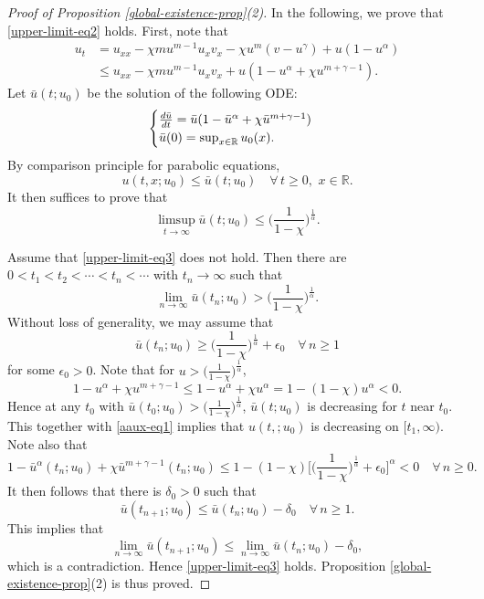 \documentclass[11pt]{article} %
\theoremstyle{remark}
\theoremstyle{remark}
\numberwithin{equation}{section}
\numberwithin{figure}{section}
\numberwithin{table}{section}
\begin{document}
\begin{proof} [Proof of Proposition \ref{global-existence-prop}(2)]
In the following, we prove that \eqref{upper-limit-eq2} holds. 
First,  note that
\begin{align*}
u_t&=u_{xx}-\chi m u^{m-1} u_x v_x-\chi u^m (v-u^\gamma)+u(1-u^\alpha)\\
&\le u_{xx}-\chi m u^{m-1} u_x v_x +u (1- u^\alpha +\chi u^{m+\gamma -1}).
\end{align*}
Let $\bar u(t;u_0)$ be the solution of the following ODE:
\begin{equation*}
\begin{cases}
\frac{d \bar u}{dt}=\bar u(1-\bar u^\alpha +\chi \bar u^{m+\gamma-1})\cr
\bar u(0)=\sup_{x\in\mathbb{R}} u_0(x).
\end{cases}
\end{equation*}
By comparison principle for parabolic equations,
$$
u(t,x;u_0)\le \bar u(t;u_0)\quad \forall\, t\ge 0,\,\, x\in\mathbb{R}.
$$
It then suffices to prove that
\begin{equation}
\label{upper-limit-eq3}
\limsup_{t\to\infty} \bar u(t;u_0)\le \Big(\frac{1}{1-\chi}\Big)^{\frac{1}{\alpha}}.
\end{equation}


Assume that \eqref{upper-limit-eq3} does not hold. Then there are $0<t_1<t_2<\cdots <t_n<\cdots$ with $t_n\to\infty$  such that
$$
\lim_{n\to\infty}\bar u(t_n;u_0)>\Big(\frac{1}{1-\chi}\Big)^{\frac{1}{\alpha}}.
$$
Without loss of generality, we may assume that
\begin{equation}
\label{aaux-eq1}
\bar u(t_n;u_0)\ge \Big(\frac{1}{1-\chi}\Big)^{\frac{1}{\alpha}}+\epsilon_0\quad\forall\, n\ge 1
\end{equation}
for some $\epsilon_0>0$. 
Note that for $ u>  \Big(\frac{1}{1-\chi}\Big)^{\frac{1}{\alpha}}$,  
$$
1-u^\alpha +\chi u^{m+\gamma -1}\le 1-u^\alpha +\chi u^\alpha=1-(1-\chi) u^\alpha< 0.
$$
Hence at any $t_0$ with $\bar u(t_0;u_0)> \Big(\frac{1}{1-\chi}\Big)^{\frac{1}{\alpha}}$, 
$\bar u(t;u_0)$ is decreasing for $t$ near $t_0$. This together with \eqref{aaux-eq1} implies that
$u(t,;u_0)$ is decreasing on $[t_1,\infty)$.
Note also that 
$$
1-\bar u^\alpha (t_n;u_0)+\chi \bar u^{m+\gamma -1}(t_n;u_0)\le 1-(1-\chi) \Big[ \Big(\frac{1}{1-\chi}\Big)^{\frac{1}{\alpha}}+\epsilon_0\Big]^\alpha<0\quad \forall\, n\ge 0.
$$
It then follows that there is $\delta_0>0$ such that
$$
\bar u(t_{n+1};u_0)\le \bar u(t_n;u_0)-\delta_0\quad \forall\, n\ge 1.
$$
This implies that
$$
\lim_{n\to\infty} \bar u(t_{n+1};u_0)\le \lim_{n\to\infty} \bar u(t_n;u_0)-\delta_0,
$$
which is a contradiction. Hence \eqref{upper-limit-eq3} holds.
Proposition \ref{global-existence-prop}(2)  is thus proved.
\end{proof}
\end{document}

